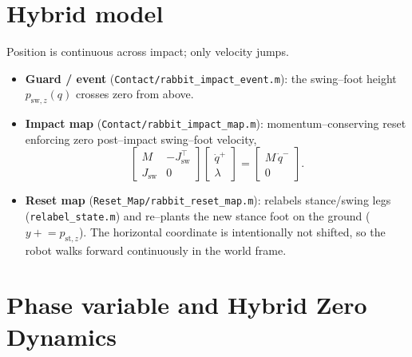 \documentclass[11pt,a4paper]{article}
\newcommand{\fname}[1]{\texttt{#1}}          %
\begin{document}
\section{Hybrid model}
Position is continuous across impact; only velocity jumps.
\begin{itemize}
  \item \textbf{Guard / event} (\fname{Contact/rabbit\_impact\_event.m}): the
        swing--foot height $p_{\mathrm{sw},z}(q)$ crosses zero from above.
  \item \textbf{Impact map} (\fname{Contact/rabbit\_impact\_map.m}):
        momentum--conserving reset enforcing zero post--impact swing--foot
        velocity,
        \begin{equation}
          \begin{bmatrix} M & -J_{\mathrm{sw}}^{\top} \\ J_{\mathrm{sw}} & 0 \end{bmatrix}
          \begin{bmatrix} \dot q^{+} \\ \lambda \end{bmatrix}
          =
          \begin{bmatrix} M\,\dot q^{-} \\ 0 \end{bmatrix}.
        \end{equation}
  \item \textbf{Reset map} (\fname{Reset\_Map/rabbit\_reset\_map.m}): relabels
        stance/swing legs (\fname{relabel\_state.m}) and re--plants the new
        stance foot on the ground ($y \mathrel{+}= p_{\mathrm{st},z}$). The
        horizontal coordinate is intentionally not shifted, so the robot walks
        forward continuously in the world frame.
\end{itemize}

\section{Phase variable and Hybrid Zero Dynamics}
\label{sec:hzd}
\end{document}
